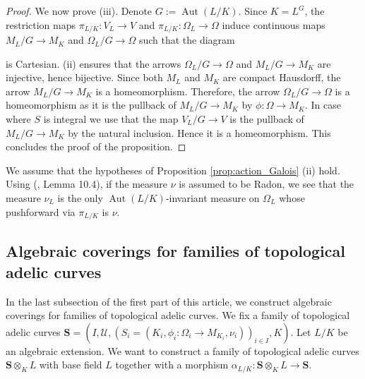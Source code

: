 \documentclass [11pt,reqno]{amsart}
\newcommand{\1}{\mathmybb{1}}
\def\cU{{\mathcal{U}}}
\def\Aut{\operatorname{Aut}}
\begin{document}
\begin{proof}
We now prove (iii). Denote $G:=\Aut(L/K)$. Since $K = L^{G}$, the restriction maps $\pi_{L/K}: V_L \to V$ and $\pi_{L/K} : \Omega_L \to \Omega$ induce continuous maps $M_L/G\to M_K$ and $\Omega_L/G \to \Omega$ such that the diagram
\begin{center}
\end{center}
is Cartesian. (ii) ensures that the arrows $\Omega_L/G \to \Omega$ and $M_L/G \to M_K$ are injective, hence bijective. Since both $M_{L}$ and $M_K$ are compact Hausdorff, the arrow $M_L/G \to M_K$ is a homeomorphism. Therefore, the arrow $\Omega_L/G \to \Omega$ is a homeomorphism as it is the pullback of $M_L/G \to M_K$ by $\phi : \Omega \to M_K$. In case where $S$ is integral we use that the map $V_L/G \to V$ is the pullback of $M_L/G \to M_K$ by the natural inclusion. Hence it is a homeomorphism. This concludes the proof of the proposition.
\end{proof}

\begin{remark}
\label{rem:uniqueness}
We assume that the hypotheses of Proposition \ref{prop:action_Galois} (ii) hold. Using (\cite{GVF24}, Lemma 10.4), if the measure $\nu$ is assumed to be Radon, we see that the measure $\nu_L$ is the only $\Aut(L/K)$-invariant measure on $\Omega_{L}$ whose pushforward via $\pi_{L/K}$ is $\nu$. 
\end{remark}


\subsection{Algebraic coverings for families of topological adelic curves}
\label{sub:algebraic_covering_family_tac}

In the last subsection of the first part of this article, we construct algebraic coverings for families of topological adelic curves. We fix a family of topological adelic curves $\mathbf{S}=(I,\cU,(S_{i}=(K_{i},\phi_{i}:\Omega_{i}\to M_{K_{i}},\nu_{i}))_{i\in I},K)$. Let $L/K$ be an algebraic extension. We want to construct a family of topological adelic curves $\mathbf{S}\otimes_{K} L$ with base field $L$ together with a morphism $\alpha_{L/K} : \mathbf{S}\otimes_{K}L \to \mathbf{S}$.
\end{document}
